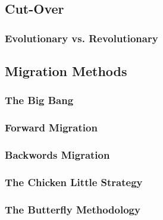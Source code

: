 \subsection{Cut-Over}
\subsubsection{Evolutionary vs. Revolutionary}
\subsection{Migration Methods}
\subsubsection{The Big Bang}
\subsubsection{Forward Migration}
\subsubsection{Backwords Migration}
\subsubsection{The Chicken Little Strategy}
\subsubsection{The Butterfly Methodology}

